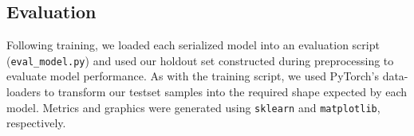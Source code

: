 \documentclass{article}
\begin{document}
\subsection{Evaluation}

Following training, we loaded each serialized model into an evaluation script (\texttt{eval\_model.py}) and used our holdout set constructed during preprocessing to evaluate model performance. As with the training script, we used PyTorch's data-loaders to transform our testset samples into the required shape expected by each model. Metrics and graphics were generated using \texttt{sklearn} and \texttt{matplotlib}, respectively.

\newpage



\end{document}
